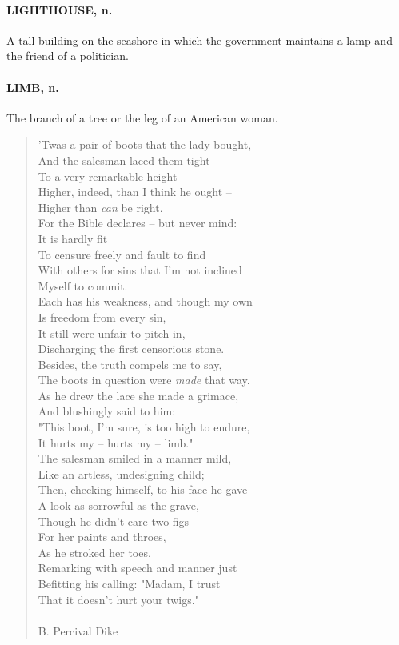 \documentclass[11pt]{article}
\begin{document}
\paragraph{LIGHTHOUSE, n.}  A tall building on the seashore in which the
government maintains a lamp and the friend of a politician.

\paragraph{LIMB, n.}  The branch of a tree or the leg of an American woman.

\begin{quote}   'Twas a pair of boots that the lady bought, \\
      And the salesman laced them tight \\
      To a very remarkable height -- \\
  Higher, indeed, than I think he ought -- \\
      Higher than {\em can} be right. \\
  For the Bible declares -- but never mind: \\
      It is hardly fit \\
  To censure freely and fault to find \\
  With others for sins that I'm not inclined \\
      Myself to commit. \\
  Each has his weakness, and though my own \\
      Is freedom from every sin, \\
      It still were unfair to pitch in, \\
  Discharging the first censorious stone. \\
  Besides, the truth compels me to say, \\
  The boots in question were {\em made} that way. \\
  As he drew the lace she made a grimace, \\
      And blushingly said to him: \\
  "This boot, I'm sure, is too high to endure, \\
  It hurts my -- hurts my -- limb." \\
  The salesman smiled in a manner mild, \\
  Like an artless, undesigning child; \\
  Then, checking himself, to his face he gave \\
  A look as sorrowful as the grave, \\
      Though he didn't care two figs \\
  For her paints and throes, \\
  As he stroked her toes, \\
  Remarking with speech and manner just \\
  Befitting his calling:  "Madam, I trust \\
      That it doesn't hurt your twigs." \\
 \\
B. Percival Dike \end{quote}
\end{document}
